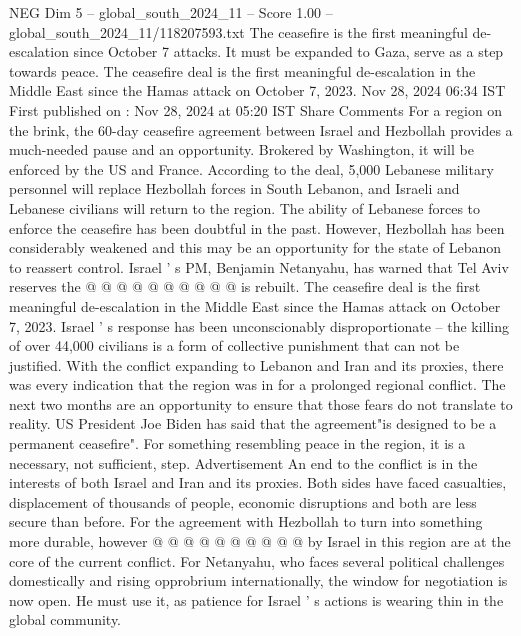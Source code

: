 \begin{textsample}{NEG Dim 5 – global\_south\_2024\_11 – Score 1.00 – global\_south\_2024\_11/118207593.txt}  \label{ex:f5_neg_437}
The ceasefire is the first meaningful de-escalation since October 7 attacks.
It must be expanded to Gaza, serve as a step towards peace.
The ceasefire deal is the first meaningful de-escalation in the Middle East since the Hamas attack on October 7, 2023.
Nov 28, 2024 06:34 IST First published on : Nov 28, 2024 at 05:20 IST Share Comments For a region on the brink, the 60-day ceasefire agreement between Israel and Hezbollah provides a much-needed pause and an opportunity.
Brokered by Washington, it will be enforced by the US and France.
According to the deal, 5,000 Lebanese military personnel will replace Hezbollah forces in South Lebanon, and Israeli and Lebanese civilians will return to the region.
The ability of Lebanese forces to enforce the ceasefire has been doubtful in the past.
However, Hezbollah has been considerably weakened and this may be an opportunity for the state of Lebanon to reassert control.
Israel ' s PM, Benjamin Netanyahu, has warned that Tel Aviv reserves the @ @ @ @ @ @ @ @ @ @ is rebuilt.
The ceasefire deal is the first meaningful de-escalation in the Middle East since the Hamas attack on October 7, 2023.
Israel ' s response has been unconscionably disproportionate -- the killing of over 44,000 civilians is a form of collective punishment that can not be justified.
With the conflict expanding to Lebanon and Iran and its proxies, there was every indication that the region was in for a prolonged regional conflict.
The next two months are an opportunity to ensure that those fears do not translate to reality.
US President Joe Biden has said that the agreement"is designed to be a permanent ceasefire".
For something resembling peace in the region, it is a necessary, not sufficient, step.
Advertisement An end to the conflict is in the interests of both Israel and Iran and its proxies.
Both sides have faced casualties, displacement of thousands of people, economic disruptions and both are less secure than before.
For the agreement with Hezbollah to turn into something more durable, however @ @ @ @ @ @ @ @ @ @ by Israel in this region are at the core of the current conflict.
For Netanyahu, who faces several political challenges domestically and rising opprobrium internationally, the window for negotiation is now open.
He must use it, as patience for Israel ' s actions is wearing thin in the global community.

\end{textsample}
